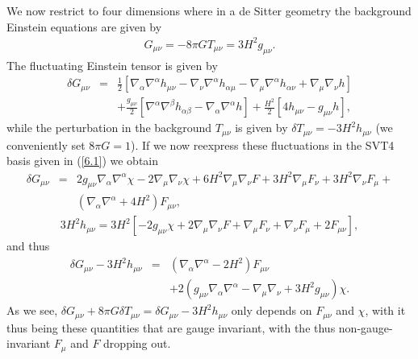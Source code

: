 We now restrict to  four dimensions where in a de Sitter geometry  the background Einstein equations are given by 
%
\begin{eqnarray}
G_{\mu\nu}=-8\pi G T_{\mu\nu}=3H^2g_{\mu\nu}.
\label{6.15}
\end{eqnarray}
% 
The fluctuating Einstein tensor is given by 
%
\begin{eqnarray}
\delta G_{\mu\nu}&=&\frac{1}{2}\left[\nabla_{\alpha}\nabla^{\alpha}h_{\mu\nu}-\nabla_{\nu}\nabla^{\alpha}h_{\alpha\mu}-\nabla_{\mu}\nabla^{\alpha}h_{\alpha\nu}+\nabla_{\mu}\nabla_{\nu}h\right]
\nonumber\\
&&
+\frac{g_{\mu\nu}}{2}\left[\nabla^{\alpha}\nabla^{\beta}h_{\alpha\beta}-\nabla_{\alpha}\nabla^{\alpha}h\right]
+\frac{H^2}{2}\left[4h_{\mu\nu}-g_{\mu\nu}h\right],
\label{6.16}
\end{eqnarray}
% 
while the perturbation in the background $T_{\mu\nu}$ is given by $\delta T_{\mu\nu}=-3H^2h_{\mu\nu}$ (we conveniently set $8\pi G=1$). If we now reexpress these fluctuations in  the SVT4 basis given in (\ref{6.1}) we obtain
%
\begin{eqnarray}
\delta G_{\mu\nu}&=&2g_{\mu\nu}\nabla_{\alpha}\nabla^{\alpha}\chi-2\nabla_{\mu}\nabla_{\nu}\chi
+6H^2\nabla_{\mu}\nabla_{\nu}F
+3H^2 \nabla_{\mu}F_{\nu}+3H^2\nabla_{\nu}F_{\mu}+
\nonumber\\
&&(\nabla_{\alpha}\nabla^{\alpha}+4H^2)F_{\mu\nu},
\label{6.17}
\end{eqnarray}
% 
%
\begin{eqnarray}
3H^2h_{\mu\nu}=3H^2\left[-2g_{\mu\nu}\chi+2\nabla_{\mu}\nabla_{\nu}F
+ \nabla_{\mu}F_{\nu}+\nabla_{\nu}F_{\mu}+2F_{\mu\nu}\right],
\label{6.18}
\end{eqnarray}
% 
and thus 
%
\begin{eqnarray}
\delta G_{\mu\nu}-3H^2h_{\mu\nu}&=&(\nabla_{\alpha}\nabla^{\alpha}-2H^2)F_{\mu\nu}
\nonumber\\
&&+2(g_{\mu\nu}\nabla_{\alpha}\nabla^{\alpha}-\nabla_{\mu}\nabla_{\nu}+3H^2g_{\mu\nu})\chi.
\label{6.19}
\end{eqnarray}
% 
As we see, $\delta G_{\mu\nu}+8\pi G\delta T_{\mu\nu}=\delta G_{\mu\nu}-3H^2h_{\mu\nu}$ only depends on $F_{\mu\nu}$ and $\chi$,  with it thus being these quantities that are  gauge invariant, with the thus non-gauge-invariant $F_{\mu}$ and $F$ dropping out.


